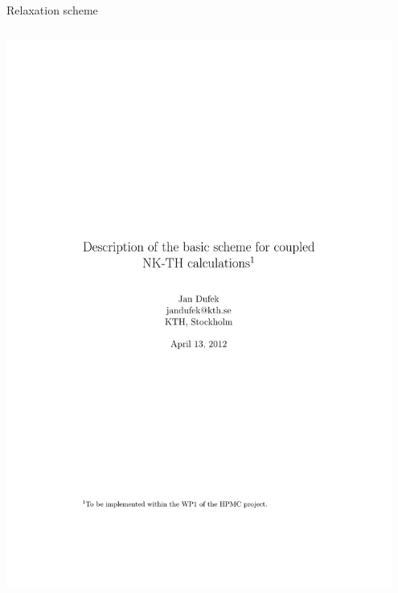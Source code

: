 \documentclass[t]{beamer}
\begin{document}
\begin{frame}{Relaxation scheme}
\begin{columns}
{            \includegraphics[page=3,viewport=105 130 500 450,clip=true,width=0.95\textwidth]{dufek.pdf}
            }
    \end{columns}

\end{frame}
\end{document}
